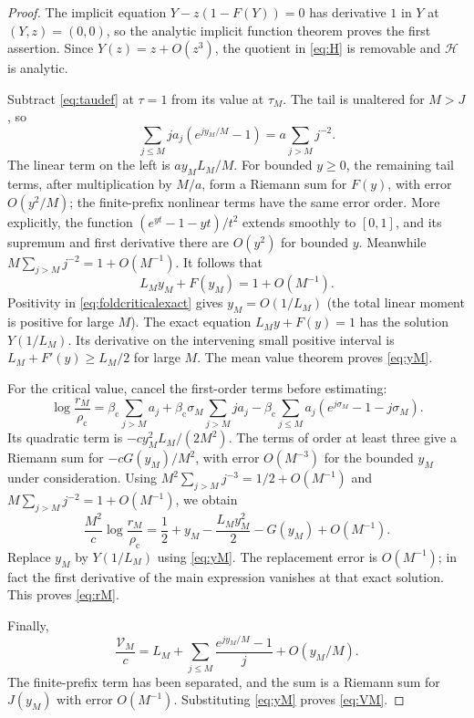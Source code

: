 \documentclass[11pt,a4paper]{article}
\numberwithin{equation}{section}
\theoremstyle{definition}
\theoremstyle{remark}
\newcommand{\bc}{\beta_{\mathrm c}}
\newcommand{\rhoc}{\rho_{\mathrm c}}
\begin{document}
\begin{proof}
The implicit equation $Y-z(1-F(Y))=0$ has derivative $1$ in $Y$ at
$(Y,z)=(0,0)$, so the analytic implicit function theorem proves the
first assertion. Since $Y(z)=z+O(z^3)$, the quotient in
\eqref{eq:H} is removable and $\mathcal H$ is analytic.

Subtract \eqref{eq:taudef} at $\tau=1$ from its value at $\tau_M$.
The tail is unaltered for $M>J$, so
\begin{equation}\label{eq:foldcriticalexact}
 \sum_{j\le M}j a_j(e^{j y_M/M}-1)
     =a\sum_{j>M}j^{-2}.
\end{equation}
The linear term on the left is $a y_M L_M/M$. For bounded $y\ge0$,
the remaining tail terms, after multiplication by $M/a$, form a
Riemann sum for $F(y)$, with error $O(y^2/M)$; the finite-prefix
nonlinear terms have the same error order. More explicitly, the
function $(e^{yt}-1-yt)/t^2$ extends smoothly to $[0,1]$, and its
supremum and first derivative there are $O(y^2)$ for bounded $y$.
Meanwhile
$M\sum_{j>M}j^{-2}=1+O(M^{-1})$. It follows that
\begin{equation}\label{eq:yapprox}
 L_M y_M+F(y_M)=1+O(M^{-1}).
\end{equation}
Positivity in \eqref{eq:foldcriticalexact} gives $y_M=O(1/L_M)$
(the total linear moment is positive for large $M$).
The exact equation $L_My+F(y)=1$ has the solution $Y(1/L_M)$.
Its derivative on the intervening small positive interval is
$L_M+F'(y)\ge L_M/2$ for large $M$. The mean value theorem proves
\eqref{eq:yM}.

For the critical value, cancel the first-order terms before estimating:
\begin{equation}\label{eq:radius-exact}
 \log\frac{r_M}{\rhoc}
 =\bc\sum_{j>M}a_j
  +\bc\sigma_M\sum_{j>M}j a_j
  -\bc\sum_{j\le M}a_j(e^{j\sigma_M}-1-j\sigma_M).
\end{equation}
Its quadratic term is $-c y_M^2L_M/(2M^2)$. The terms of order at
least three give a Riemann sum for $-cG(y_M)/M^2$, with error
$O(M^{-3})$ for the bounded $y_M$ under consideration. Using
$M^2\sum_{j>M}j^{-3}=1/2+O(M^{-1})$ and
$M\sum_{j>M}j^{-2}=1+O(M^{-1})$, we obtain
\[
 \frac{M^2}{c}\log\frac{r_M}{\rhoc}
 =\frac12+y_M-\frac{L_My_M^2}{2}-G(y_M)+O(M^{-1}).
\]
Replace $y_M$ by $Y(1/L_M)$ using \eqref{eq:yM}. The replacement
error is $O(M^{-1})$; in fact the first derivative of the main
expression vanishes at that exact solution. This proves \eqref{eq:rM}.

Finally,
\[
 \frac{\mathcal V_M}{c}=L_M+
 \sum_{j\le M}\frac{e^{j y_M/M}-1}{j}+O(y_M/M).
\]
The finite-prefix term has been separated, and the sum is a Riemann sum
for $J(y_M)$ with error $O(M^{-1})$. Substituting
\eqref{eq:yM} proves \eqref{eq:VM}.
\end{proof}
\end{document}
